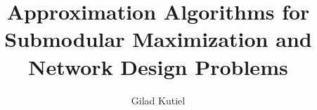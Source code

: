 \title{Approximation Algorithms for Submodular Maximization and Network Design Problems}

\author[1]{Gilad Kutiel}

